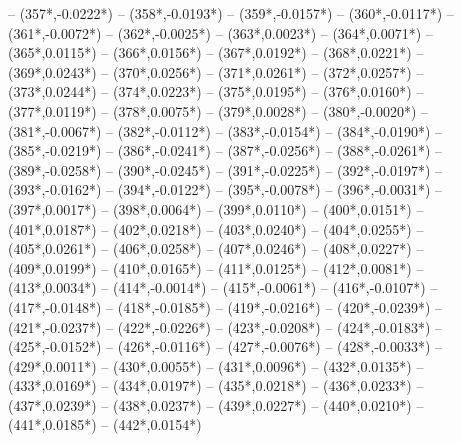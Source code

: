 {		-- ({357*\dx},{-0.0222*\dy})
		-- ({358*\dx},{-0.0193*\dy})
		-- ({359*\dx},{-0.0157*\dy})
		-- ({360*\dx},{-0.0117*\dy})
		-- ({361*\dx},{-0.0072*\dy})
		-- ({362*\dx},{-0.0025*\dy})
		-- ({363*\dx},{0.0023*\dy})
		-- ({364*\dx},{0.0071*\dy})
		-- ({365*\dx},{0.0115*\dy})
		-- ({366*\dx},{0.0156*\dy})
		-- ({367*\dx},{0.0192*\dy})
		-- ({368*\dx},{0.0221*\dy})
		-- ({369*\dx},{0.0243*\dy})
		-- ({370*\dx},{0.0256*\dy})
		-- ({371*\dx},{0.0261*\dy})
		-- ({372*\dx},{0.0257*\dy})
		-- ({373*\dx},{0.0244*\dy})
		-- ({374*\dx},{0.0223*\dy})
		-- ({375*\dx},{0.0195*\dy})
		-- ({376*\dx},{0.0160*\dy})
		-- ({377*\dx},{0.0119*\dy})
		-- ({378*\dx},{0.0075*\dy})
		-- ({379*\dx},{0.0028*\dy})
		-- ({380*\dx},{-0.0020*\dy})
		-- ({381*\dx},{-0.0067*\dy})
		-- ({382*\dx},{-0.0112*\dy})
		-- ({383*\dx},{-0.0154*\dy})
		-- ({384*\dx},{-0.0190*\dy})
		-- ({385*\dx},{-0.0219*\dy})
		-- ({386*\dx},{-0.0241*\dy})
		-- ({387*\dx},{-0.0256*\dy})
		-- ({388*\dx},{-0.0261*\dy})
		-- ({389*\dx},{-0.0258*\dy})
		-- ({390*\dx},{-0.0245*\dy})
		-- ({391*\dx},{-0.0225*\dy})
		-- ({392*\dx},{-0.0197*\dy})
		-- ({393*\dx},{-0.0162*\dy})
		-- ({394*\dx},{-0.0122*\dy})
		-- ({395*\dx},{-0.0078*\dy})
		-- ({396*\dx},{-0.0031*\dy})
		-- ({397*\dx},{0.0017*\dy})
		-- ({398*\dx},{0.0064*\dy})
		-- ({399*\dx},{0.0110*\dy})
		-- ({400*\dx},{0.0151*\dy})
		-- ({401*\dx},{0.0187*\dy})
		-- ({402*\dx},{0.0218*\dy})
		-- ({403*\dx},{0.0240*\dy})
		-- ({404*\dx},{0.0255*\dy})
		-- ({405*\dx},{0.0261*\dy})
		-- ({406*\dx},{0.0258*\dy})
		-- ({407*\dx},{0.0246*\dy})
		-- ({408*\dx},{0.0227*\dy})
		-- ({409*\dx},{0.0199*\dy})
		-- ({410*\dx},{0.0165*\dy})
		-- ({411*\dx},{0.0125*\dy})
		-- ({412*\dx},{0.0081*\dy})
		-- ({413*\dx},{0.0034*\dy})
		-- ({414*\dx},{-0.0014*\dy})
		-- ({415*\dx},{-0.0061*\dy})
		-- ({416*\dx},{-0.0107*\dy})
		-- ({417*\dx},{-0.0148*\dy})
		-- ({418*\dx},{-0.0185*\dy})
		-- ({419*\dx},{-0.0216*\dy})
		-- ({420*\dx},{-0.0239*\dy})
		-- ({421*\dx},{-0.0237*\dy})
		-- ({422*\dx},{-0.0226*\dy})
		-- ({423*\dx},{-0.0208*\dy})
		-- ({424*\dx},{-0.0183*\dy})
		-- ({425*\dx},{-0.0152*\dy})
		-- ({426*\dx},{-0.0116*\dy})
		-- ({427*\dx},{-0.0076*\dy})
		-- ({428*\dx},{-0.0033*\dy})
		-- ({429*\dx},{0.0011*\dy})
		-- ({430*\dx},{0.0055*\dy})
		-- ({431*\dx},{0.0096*\dy})
		-- ({432*\dx},{0.0135*\dy})
		-- ({433*\dx},{0.0169*\dy})
		-- ({434*\dx},{0.0197*\dy})
		-- ({435*\dx},{0.0218*\dy})
		-- ({436*\dx},{0.0233*\dy})
		-- ({437*\dx},{0.0239*\dy})
		-- ({438*\dx},{0.0237*\dy})
		-- ({439*\dx},{0.0227*\dy})
		-- ({440*\dx},{0.0210*\dy})
		-- ({441*\dx},{0.0185*\dy})
		-- ({442*\dx},{0.0154*\dy})
}
